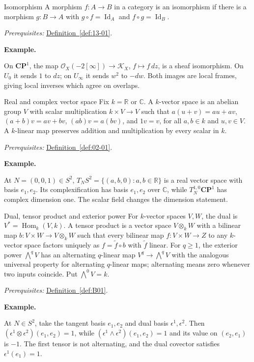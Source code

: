 \documentclass[11pt]{article}
\makeatletter
\newcommand{\R}{\mathbb R}
\newcommand{\C}{\mathbb C}
\newcommand{\id}{\operatorname{Id}}
\newcounter{definition}
\newcommand{\CP}{\mathbf{CP}}
\newcommand{\exampleheading}{\par\medskip\textbf{Example.}\par\smallskip}
\newcommand{\currentdefinition}[1]{\protected@edef\@currentlabel{#1}}
\makeatother
\begin{document}
\begin{definitionbox}{Isomorphism}
\currentdefinition{\thedefinition}
\label{def:13-02}
A morphism $f:A\to B$ in a category is an isomorphism if there is a morphism $g:B\to A$ with $g\circ f=\id_A$ and $f\circ g=\id_B$.

\smallskip
\textit{Prerequisites:} \hyperref[def:13-01]{Definition~\ref*{def:13-01}}.

\exampleheading
On $\CP^1$, the map $\mathcal O_X(-2[\infty])\to\mathcal K_X$, $f\mapsto f\,dz$, is a sheaf isomorphism. On $U_0$ it sends $1$ to $dz$; on $U_\infty$ it sends $w^2$ to $-dw$. Both images are local frames, giving local inverses which agree on overlaps.
\end{definitionbox}

\begin{definitionbox}{Real and complex vector space}
\currentdefinition{\thedefinition}
\label{def:B01}
Fix $k=\R$ or $\C$. A $k$-vector space is an abelian group $V$ with scalar multiplication $k\times V\to V$ such that $a(u+v)=au+av$, $(a+b)v=av+bv$, $(ab)v=a(bv)$, and $1v=v$, for all $a,b\in k$ and $u,v\in V$. A $k$-linear map preserves addition and multiplication by every scalar in $k$.

\smallskip
\textit{Prerequisites:} \hyperref[def:02-01]{Definition~\ref*{def:02-01}}.

\exampleheading
At $N=(0,0,1)\in S^2$, $T_NS^2=\{(a,b,0):a,b\in\R\}$ is a real vector space with basis $e_1,e_2$. Its complexification has basis $e_1,e_2$ over $\C$, while $T_N^{1,0}\CP^1$ has complex dimension one. The scalar field changes the dimension statement.
\end{definitionbox}

\begin{definitionbox}{Dual, tensor product and exterior power}
\currentdefinition{\thedefinition}
\label{def:B02}
For $k$-vector spaces $V,W$, the dual is $V^*=\operatorname{Hom}_k(V,k)$. A tensor product is a vector space $V\otimes_k W$ with a bilinear map $b:V\times W\to V\otimes_kW$ such that every bilinear map $f:V\times W\to Z$ to any $k$-vector space factors uniquely as $f=\widetilde f\circ b$ with $\widetilde f$ linear. For $q\ge1$, the exterior power $\bigwedge^qV$ has an alternating $q$-linear map $V^q\to\bigwedge^qV$ with the analogous universal property for alternating $q$-linear maps; alternating means zero whenever two inputs coincide. Put $\bigwedge^0V=k$.

\smallskip
\textit{Prerequisites:} \hyperref[def:B01]{Definition~\ref*{def:B01}}.

\exampleheading
At $N\in S^2$, take the tangent basis $e_1,e_2$ and dual basis $\epsilon^1,\epsilon^2$. Then $(\epsilon^1\otimes\epsilon^2)(e_1,e_2)=1$, while $(\epsilon^1\wedge\epsilon^2)(e_1,e_2)=1$ and its value on $(e_2,e_1)$ is $-1$. The first tensor is not alternating, and the dual covector satisfies $\epsilon^1(e_1)=1$.
\end{definitionbox}
\end{document}
